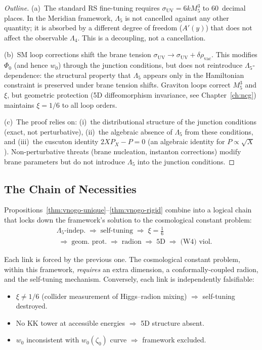 \begin{proof}[Outline]
(a)~The standard RS fine-tuning requires $\sigma_{\mathrm{UV}} = 6kM_5^3$ to 60~decimal places. In the Meridian framework, $\Lambda_5$ is not cancelled against any other quantity; it is absorbed by a different degree of freedom ($A'(y)$) that does not affect the observable $\Lambda_4$. This is a decoupling, not a cancellation.

(b)~SM loop corrections shift the brane tension $\sigma_{\mathrm{UV}} \to \sigma_{\mathrm{UV}} + \delta\rho_{\mathrm{vac}}$. This modifies $\Phi_0$ (and hence $w_0$) through the junction conditions, but does not reintroduce $\Lambda_5$-dependence: the structural property that $\Lambda_5$ appears only in the Hamiltonian constraint is preserved under brane tension shifts. Graviton loops correct $M_5^3$ and $\xi$, but geometric protection (5D diffeomorphism invariance, see Chapter~\ref{ch:ncg}) maintains $\xi = 1/6$ to all loop orders.

(c)~The proof relies on: (i)~the distributional structure of the junction conditions (exact, not perturbative), (ii)~the algebraic absence of $\Lambda_5$ from these conditions, and (iii)~the cuscuton identity $2XP_X - P = 0$ (an algebraic identity for $P \propto \sqrt{X}$). Non-perturbative threats (brane nucleation, instanton corrections) modify brane parameters but do not introduce $\Lambda_5$ into the junction conditions.
\end{proof}

\subsection{The Chain of Necessities}
\label{sec:3-vnogo-chain}

Propositions~\ref{thm:vnogo-unique}--\ref{thm:vnogo-rigid} combine into a logical chain that locks down the framework's solution to the cosmological constant problem:
\begin{equation}
  \boxed{\begin{aligned}
  &\Lambda_5\text{-indep.} \;\Longrightarrow\;
  \text{self-tuning} \;\Longrightarrow\;
  \xi = \tfrac{1}{6} \\
  &\;\Longrightarrow\;
  \text{geom.\ prot.} \;\Longrightarrow\;
  \text{radion} \;\Longrightarrow\;
  \text{5D} \;\Longrightarrow\;
  \text{(W4) viol.}
  \end{aligned}}
  \label{eq:3-necessity-chain}
\end{equation}

Each link is forced by the previous one. The cosmological constant problem, within this framework, \emph{requires} an extra dimension, a conformally-coupled radion, and the self-tuning mechanism. Conversely, each link is independently falsifiable:
\begin{itemize}
  \item $\xi \neq 1/6$ (collider measurement of Higgs--radion mixing) $\Longrightarrow$ self-tuning destroyed.
  \item No KK tower at accessible energies $\Longrightarrow$ 5D structure absent.
  \item $w_0$ inconsistent with $w_0(\zeta_0)$ curve $\Longrightarrow$ framework excluded.
\end{itemize}

